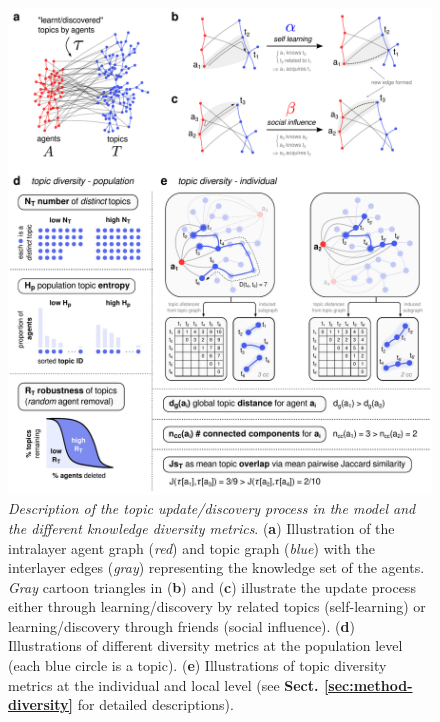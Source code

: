 \begin{figure}[!ht]
    \centering
    \includegraphics[width=\textwidth]{figures/Fig1.pdf}
    \caption{
    \textit{Description of the topic update/discovery process in the model and the different knowledge diversity metrics}.
    (\textbf{a}) Illustration of the intralayer agent graph (\textit{red}) and topic graph (\textit{blue}) with the interlayer edges (\textit{gray}) representing the knowledge set of the agents.
    \textit{Gray} cartoon triangles in (\textbf{b}) and (\textbf{c}) illustrate the update process either through learning/discovery by related topics (self-learning) or learning/discovery through friends (social influence).
    (\textbf{d}) Illustrations of different diversity metrics at the population level (each blue circle is a topic).
    (\textbf{e}) Illustrations of topic diversity metrics at the individual and local level (see \textbf{Sect. \ref{sec:method-diversity}} for detailed descriptions).
    }
    \label{fig:1}
\end{figure}